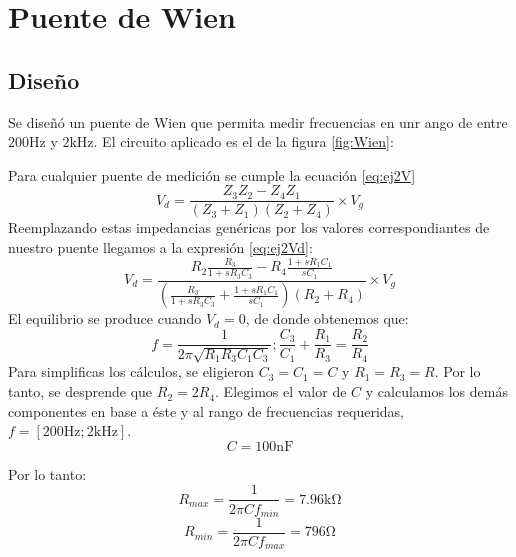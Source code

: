 \chapter{Puente de Wien}
\section{Diseño}
Se diseñó un puente de Wien que permita medir frecuencias en unr ango de entre
$200 \si{\hertz}$ y $2\si{\kilo\hertz}$. El circuito aplicado es el de la figura
\ref{fig:Wien}:
\begin{figure}[ht]
    \begin{center}
        
    \end{center}
\end{figure}

Para cualquier puente de medición se cumple la ecuación \ref{eq:ej2V}
\begin{equation}
    V_d=\frac{Z_3 Z_2 - Z_4 Z_1}{(Z_3 + Z_1)(Z_2 + Z_4)} \times V_g
    \label{eq:ej2V}
\end{equation}
Reemplazando estas impedancias genéricas por los valores correspondiantes de nuestro
puente llegamos a la expresión \ref{eq:ej2Vd}:
\begin{equation}
    V_d= \frac{R_2 \frac{R_3}{1+s R_3 C_3} - R_4 \frac{1+s R_1 C_1}{s C_1}}{(\frac{R_3}{1+s R_3 C_3} + \frac{1+s R_1 C_1}{s C_1}) (R_2 + R_4)} \times V_g
    \label{eq:ej2Vd}
\end{equation}
El equilibrio se produce cuando $V_d=0$, de donde obtenemos que:
\begin{equation}
    f = \frac{1}{2 \pi \sqrt{R_1 R_3 C_1 C_3}} ; \frac{C_3}{C_1}+\frac{R_1}{R_3}=\frac{R_2}{R_4}
\end{equation}
Para simplificas los cálculos, se eligieron $C_3=C_1=C$ y $R_1=R_3=R$. Por lo tanto,
se desprende que $R_2 = 2 R_4$.
Elegimos el valor de $C$ y calculamos los demás componentes en base a éste y al rango
de frecuencias requeridas, $f=[200 \si{\hertz};2\si{\kilo\hertz}]$.
\begin{equation}
    C = 100\si{\nano\farad}
\end{equation}


Por lo tanto:
\begin{equation}
    R_{max} = \frac{1}{2 \pi C f_{min}}= 7.96\si{\kilo\ohm}
\end{equation}
\begin{equation}
    R_{min} = \frac{1}{2 \pi C f_{max}}= 796\si{\ohm}
\end{equation}

